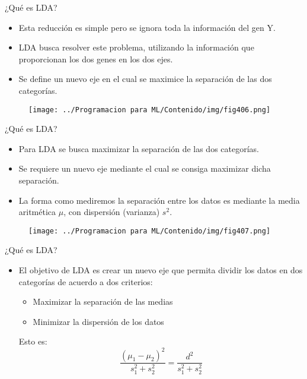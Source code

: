 \documentclass[11pt,aspectratio=169]{beamer}
\begin{document}
\begin{frame}{¿Qué es LDA?}
\begin{itemize}
	\item Esta reducción es simple pero se ignora toda la información del gen Y. \pause
	\item LDA busca resolver este problema, utilizando la información que proporcionan los dos genes en los dos ejes.\pause 
	\item Se define un nuevo eje en el cual se maximice la separación de las dos categorías. \pause
\end{itemize}
\begin{figure}[H]
	\centering
	\texttt{[image: ../Programacion para ML/Contenido/img/fig406.png]}
\end{figure}
\end{frame}

\begin{frame}{¿Qué es LDA?}
\begin{itemize}
	\item Para LDA se busca maximizar la separación de las dos categorías.\pause
	\item Se requiere un nuevo eje mediante el cual se consiga maximizar dicha separación.\pause
	\item La forma como mediremos la separación entre los datos es mediante la media aritmética $\mu$, con dispersión (varianza) $s^2$.\pause
\end{itemize}
\begin{figure}[H]
	\centering
	\texttt{[image: ../Programacion para ML/Contenido/img/fig407.png]}
\end{figure}
\end{frame}

\begin{frame}{¿Qué es LDA?}
\begin{itemize}
	\item El objetivo de LDA es crear un nuevo eje que permita dividir los datos en dos categorías de acuerdo a dos criterios:\pause
		\begin{itemize}
			\item Maximizar la separación de las medias\pause
			\item Minimizar la dispersión de los datos\pause
\end{itemize}			
Esto es: \pause
\begin{equation}
	\dfrac{(\mu_1 - \mu_2)^2}{s_1^2 + s_2^2} = \dfrac{d^2}{s_1^2 + s_2^2}
\end{equation}
\end{itemize}
\end{frame}
\end{document}
